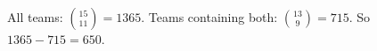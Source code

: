 All teams: $\binom{15}{11}=1365$. Teams containing both: $\binom{13}{9}=715$. So $1365-715=\boxed{650}$.

